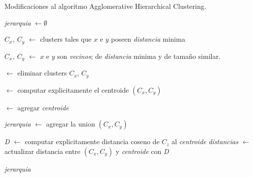 \settowidth{}
\addtolength\mylen{\parindent}

\begin{algorithm}[h]
\caption{Modificaciones al algoritmo Agglomerative Hierarchical Clustering.}
\label{alg:morenoahc}
\begin{algorithmic}[1]

                      
    \State \emph{jerarquia} $\gets \emptyset$
                      


        \State \emph{$C_x$, $C_y$} $\gets$ clusters tales que $x$ e $y$ poseen \emph{distancia} minima      
            
    \Else{}

        \State \emph{$C_x$, $C_y$} $\gets$ $x$ e $y$ son \emph{vecinos}; 
                                   de \emph{distancia} minima y de tama\~no similar.

    \EndIf
    
     $\gets$ eliminar clusters $C_x$, $C_y$

     $\gets$ computar explicitamente el centroide $(C_x,C_y)$ 

     $\gets$ agregar \emph{centroide}
    
    \State \emph{jerarquia} $\gets$ agregar la union $(C_x,C_y)$
    
        \State \emph{D} $\gets$ computar explicitamente distancia coseno de $C_z$ al \emph{centroide}
        \State \emph{distancias} $\gets$ actualizar distancia entre $(C_x,C_y)$ y \emph{centroide} con \emph{D}
    \EndFor            
    
\EndFor

\State \Return \emph{jerarquia} 
 
\EndProcedure 

\end{algorithmic}
\end{algorithm}


